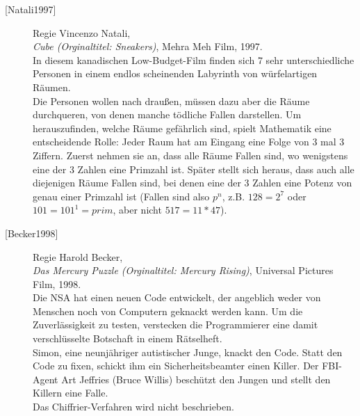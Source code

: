 \begin{refsegment}
\begin{description}
\item[\textrm{[Natali1997]}] 
    Regie Vincenzo Natali, \\
    {\em Cube (Orginaltitel: Sneakers)},
    Mehra Meh Film, 1997. \\
    In diesem kanadischen Low-Budget-Film finden sich 7 sehr unterschiedliche
    Personen in einem endlos scheinenden Labyrinth von würfelartigen Räumen.\\
    Die Personen wollen nach draußen, müssen dazu aber die Räume durchqueren,
    von denen manche tödliche Fallen darstellen. Um herauszufinden, welche
    Räume gefährlich sind, spielt Mathematik eine entscheidende Rolle: Jeder
    Raum hat am Eingang eine Folge von 3 mal 3 Ziffern. Zuerst nehmen
    sie an, dass alle Räume Fallen sind, wo wenigstens eine der 3 Zahlen eine
    Primzahl ist. Später stellt sich heraus, dass auch alle diejenigen Räume
    Fallen sind, bei denen eine der 3 Zahlen eine Potenz von genau einer
    Primzahl ist (Fallen sind also $p^n$, z.B. $128=2^7$ oder
    $101 = 101^1 = prim$, aber nicht $517 = 11*47$).\\


\item[\textrm{[Becker1998]}] 
    Regie Harold Becker, \\
    {\em Das Mercury Puzzle (Orginaltitel: Mercury Rising)},
    Universal Pictures Film, 1998. \\
    Die NSA hat einen neuen Code entwickelt, der angeblich weder von Menschen
    noch von Computern geknackt werden kann. Um die Zuverlässigkeit zu testen,
    verstecken die Programmierer eine damit verschlüsselte Botschaft in
    einem Rätselheft.\\
    Simon, eine neunjähriger autistischer Junge, knackt den Code.
    Statt den Code zu fixen, schickt ihm ein Sicherheitsbeamter einen Killer.
    Der FBI-Agent Art Jeffries (Bruce Willis) beschützt den Jungen und
    stellt den Killern eine Falle.\\
    Das Chiffrier-Verfahren wird nicht beschrieben.\\



\end{description}
\end{refsegment}
